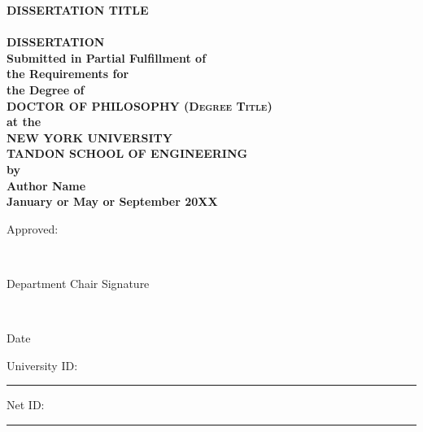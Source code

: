 
\begin{titlepage}
\begin{center}
\enlargethispage{24pt}

\sffamily
\bfseries
\Large{DISSERTATION TITLE} \\
\HRule \\

\textsc{
\textrm{
\Large{DISSERTATION}}}\\[0.25cm]
\normalsize{Submitted in Partial Fulfillment of \\
the Requirements for \\
the Degree of} \\[0.5cm]
\textsc{
\textrm{
\Large{DOCTOR OF PHILOSOPHY (Degree Title)}}} \\[0.5cm]
at the \\
\textsc{
\textrm{
\Large{NEW YORK UNIVERSITY \\
\setlength{\parskip}{-.5em}
TANDON SCHOOL OF ENGINEERING}}} \\
by \\[0.5cm]

\textrm{
\Large
Author Name}\\[0.25cm]

\textrm{
January or May or September 20XX} \\[1cm]

\end{center}

\normalsize{
\hspace{8cm} Approved:}


\hspace{8cm} \hrulefill\

\vspace{-0.5cm}

\hspace{8cm}
\small{Department Chair Signature


\hspace{8cm} \hrulefill\

\vspace{-0.5cm}

\hspace{8cm} Date}

\vspace{0.5cm}

\normalsize{
University ID:}
\hspace{0.25cm}
\rule{5cm}{0.15mm}


Net ID:
\hspace{1.35cm}
\rule{5cm}{0.15mm}


\end{titlepage}
